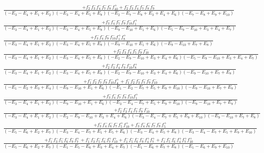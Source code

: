 \documentclass{article}
\begin{document}
\[\begin{array}{rcl}
\frac{+f_{2}^{-}f_{3}^{-}f_{4}^{-}f_{7}^{-}f_{8}^{-}f_{10}^{+}+f_{2}^{-}f_{3}^{-}f_{4}^{-}f_{7}^{-}f_{8}^{-}f_{9}^{-}}{(-E_{3}-E_{4}+E_{1}+E_{2})(-E_{3}-E_{4}+E_{5}+E_{8})(-E_{2}-E_{7}-E_{8}+E_{3}+E_{4}+E_{6})(-E_{7}-E_{8}+E_{9}+E_{10})}\\
\frac{+f_{3}^{-}f_{4}^{-}f_{5}^{-}f_{9}^{-}f_{10}^{-}f_{1}^{+}}{(-E_{3}-E_{4}+E_{1}+E_{2})(-E_{3}-E_{4}+E_{5}+E_{8})(-E_{9}-E_{10}+E_{1}+E_{6})(-E_{5}-E_{9}-E_{10}+E_{3}+E_{4}+E_{7})}\\
\frac{+f_{3}^{-}f_{4}^{-}f_{9}^{-}f_{10}^{-}f_{1}^{+}f_{8}^{+}}{(-E_{3}-E_{4}+E_{1}+E_{2})(-E_{3}-E_{4}+E_{5}+E_{8})(-E_{9}-E_{10}+E_{1}+E_{6})(-E_{9}-E_{10}+E_{7}+E_{8})}\\
\frac{+f_{2}^{-}f_{3}^{-}f_{4}^{-}f_{5}^{-}f_{9}^{-}f_{10}^{-}}{(-E_{3}-E_{4}+E_{1}+E_{2})(-E_{3}-E_{4}+E_{5}+E_{8})(-E_{2}-E_{9}-E_{10}+E_{3}+E_{4}+E_{6})(-E_{5}-E_{9}-E_{10}+E_{3}+E_{4}+E_{7})}\\
\frac{+f_{2}^{-}f_{3}^{-}f_{4}^{-}f_{9}^{-}f_{10}^{-}f_{8}^{+}}{(-E_{3}-E_{4}+E_{1}+E_{2})(-E_{3}-E_{4}+E_{5}+E_{8})(-E_{2}-E_{9}-E_{10}+E_{3}+E_{4}+E_{6})(-E_{9}-E_{10}+E_{7}+E_{8})}\\
\frac{+f_{1}^{-}f_{2}^{-}f_{7}^{-}f_{9}^{-}f_{10}^{-}f_{4}^{+}+f_{1}^{-}f_{2}^{-}f_{3}^{-}f_{7}^{-}f_{9}^{-}f_{10}^{-}}{(-E_{1}-E_{2}+E_{3}+E_{4})(-E_{9}-E_{10}+E_{1}+E_{6})(-E_{1}-E_{2}-E_{7}+E_{5}+E_{9}+E_{10})(-E_{9}-E_{10}+E_{7}+E_{8})}\\
\frac{+f_{3}^{-}f_{4}^{-}f_{7}^{-}f_{9}^{-}f_{10}^{-}f_{1}^{+}}{(-E_{3}-E_{4}+E_{1}+E_{2})(-E_{9}-E_{10}+E_{1}+E_{6})(-E_{3}-E_{4}-E_{7}+E_{5}+E_{9}+E_{10})(-E_{9}-E_{10}+E_{7}+E_{8})}\\
\frac{+f_{2}^{-}f_{3}^{-}f_{4}^{-}f_{7}^{-}f_{9}^{-}f_{10}^{-}}{(-E_{3}-E_{4}+E_{1}+E_{2})(-E_{2}-E_{9}-E_{10}+E_{3}+E_{4}+E_{6})(-E_{3}-E_{4}-E_{7}+E_{5}+E_{9}+E_{10})(-E_{9}-E_{10}+E_{7}+E_{8})}\\
\frac{+f_{3}^{-}f_{4}^{-}f_{6}^{-}f_{7}^{-}f_{5}^{+}f_{10}^{+}+f_{3}^{-}f_{4}^{-}f_{6}^{-}f_{7}^{-}f_{9}^{-}f_{5}^{+}}{(-E_{5}-E_{6}+E_{2}+E_{7})(-E_{3}-E_{4}-E_{7}+E_{1}+E_{5}+E_{6})(-E_{3}-E_{4}+E_{5}+E_{8})(-E_{3}-E_{4}-E_{7}+E_{5}+E_{9}+E_{10})}\\
\frac{+f_{1}^{-}f_{3}^{-}f_{5}^{-}f_{6}^{-}f_{9}^{-}f_{7}^{+}+f_{1}^{-}f_{3}^{-}f_{5}^{-}f_{6}^{-}f_{7}^{+}f_{10}^{+}+f_{1}^{-}f_{5}^{-}f_{6}^{-}f_{9}^{-}f_{4}^{+}f_{7}^{+}+f_{1}^{-}f_{5}^{-}f_{6}^{-}f_{4}^{+}f_{7}^{+}f_{10}^{+}}{(-E_{5}-E_{6}+E_{2}+E_{7})(-E_{1}-E_{5}-E_{6}+E_{3}+E_{4}+E_{7})(-E_{1}-E_{6}+E_{7}+E_{8})(-E_{1}-E_{6}+E_{9}+E_{10})}\\

\end{array}\]
\end{document}
